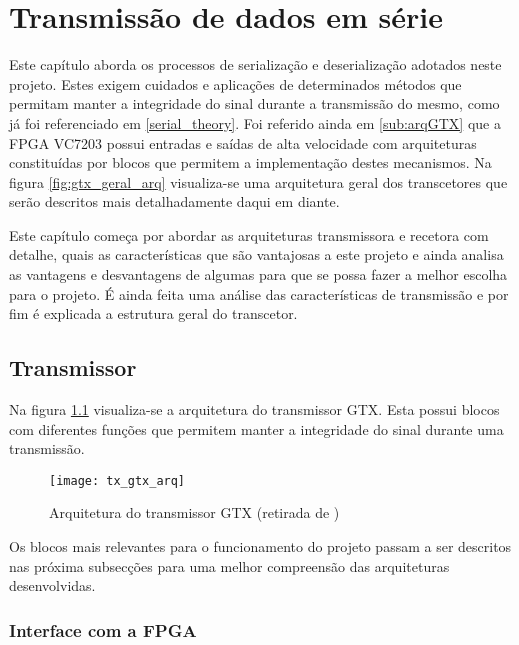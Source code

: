 \chapter{Transmissão de dados em série}\label{chap:chap4}

Este capítulo aborda os processos de serialização e deserialização adotados neste projeto. Estes exigem cuidados e aplicações de determinados métodos que permitam manter a integridade do sinal durante a transmissão do mesmo, como já foi referenciado em \ref{serial_theory}. Foi referido ainda em \ref{sub:arqGTX} que a FPGA VC7203 possui entradas e saídas de alta velocidade com arquiteturas constituídas por blocos que permitem a implementação destes mecanismos. Na figura \ref{fig:gtx_geral_arq} visualiza-se uma arquitetura geral dos transcetores que serão descritos mais detalhadamente daqui em diante.

Este capítulo começa por abordar as arquiteturas transmissora e recetora com detalhe, quais as características que são vantajosas a este projeto e ainda analisa as vantagens e desvantagens de algumas para que se possa fazer a melhor escolha para o projeto. É ainda feita uma análise das características de transmissão e por fim é explicada a estrutura geral do transcetor.

\section{Transmissor} \label{sec:tx_gtx}

Na figura \ref{fig:gtx_tx_arq} visualiza-se a arquitetura do transmissor GTX.  Esta possui blocos com diferentes funções que permitem manter a integridade do sinal durante uma transmissão.

\begin{figure}[h!]
	\begin{center}
		\leavevmode
		\texttt{[image: tx\_gtx\_arq]}
		\caption[Arquitetura do transmissor GTX]{Arquitetura do transmissor GTX (retirada de \cite{R011})}
		\label{fig:gtx_tx_arq}
	\end{center}
\end{figure}

Os blocos mais relevantes para o funcionamento do projeto passam a ser descritos nas próxima subsecções para uma melhor compreensão das arquiteturas desenvolvidas.

\subsection{Interface com a FPGA} \label{subch:tx_interface}

